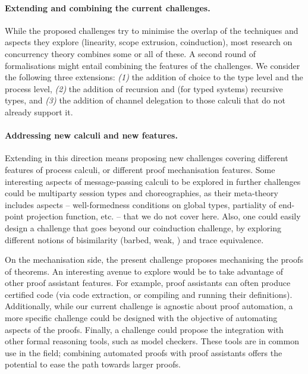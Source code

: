 \documentclass[runningheads]{llncs}
\begin{document}
\paragraph{Extending and combining the current challenges.}
While the proposed challenges try to minimise the overlap of the techniques
and aspects they explore (linearity, scope extrusion, coinduction), most
research on concurrency theory combines some or all of these. A second round of formalisations might
entail combining the features of the challenges.
We consider the following three extensions:
\emph{(1)} the addition of choice to the type level and the process level,
\emph{(2)} the addition of recursion and (for typed systems) recursive types,
and \emph{(3)} the
addition of channel delegation to those calculi that do not already
support it.%
%


\vspace{-1mm}%
\paragraph{Addressing new calculi and new features.}
Extending in this direction
means proposing new challenges covering different features of
process calculi, or different proof mechanisation features.
Some interesting aspects of message-passing calculi to be explored in
further challenges could be multiparty session types and
choreographies, as their meta-theory includes aspects -- \eg well-formedness conditions on global types, partiality of end-point projection function, etc. --
that we do not cover here. Also, one could easily
design a challenge that goes beyond our coinduction challenge, by
exploring different notions of bisimilarity (barbed, weak, \etc)
and trace equivalence.

On the mechanisation side, the present challenge proposes mechanising the
proofs of theorems. An interesting avenue to explore would be to take advantage
of other proof assistant features. For example, proof assistants can often
produce certified code (via code extraction, or compiling and running their
definitions). Additionally, while our current challenge is agnostic about proof
automation, a more specific challenge could be designed with the objective of
automating aspects of the proofs. Finally, a challenge could propose the
integration with other formal reasoning tools, such as model checkers. These
tools are in common use in the field; combining automated proofs with
proof assistants offers the potential to ease the path towards larger proofs.
\end{document}
